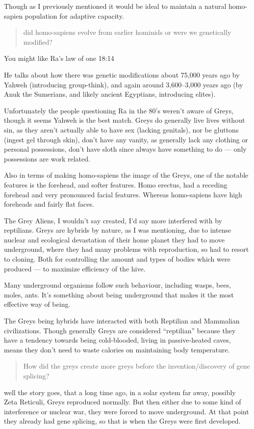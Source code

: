 Though as I previously mentioned it would be ideal to maintain a natural
homo-sapien population for adaptive capacity.


\blockquote{did homo-sapiens evolve from earlier hominids or were we genetically
modified?}

You might like Ra's law of one 18:14

He talks about how there was genetic modifications about 75,000 years ago by
Yahweh (introducing group-think), and again around 3,600--3,000 years ago (by
Anuk the Sumerians, and likely ancient Egyptians, introducing elites).

Unfortunately the people questioning Ra in the 80's weren't aware of Greys,
though it seems Yahweh is the best match. Greys do generally live lives without
sin, as they aren't actually able to have sex (lacking genitals), nor be
gluttons (ingest gel through skin), don't have any vanity, as generally lack any
clothing or personal possessions, don't have sloth since always have something to
do --- only possessions are work related.

Also in terms of making homo-sapiens the image of the Greys, one of the notable
features is the forehead, and softer features. Homo erectus, had a receding
forehead and very pronounced facial features. Whereas homo-sapiens have high
foreheads and fairly flat faces.

The Grey Aliens, I wouldn't say created, I'd say more interfered with by
reptilians. Greys are hybrids by nature, as I was mentioning, due to intense
nuclear and ecological devastation of their home planet they had to move
underground, where they had many problems with reproduction, so had to resort to
cloning. Both for controlling the amount and types of bodies which were produced
--- to maximize efficiency of the hive.

Many underground organisms follow such behaviour, including wasps, bees, moles,
ants. It's something about being underground that makes it the most effective
way of being.

The Greys being hybrids have interacted with both Reptilian and Mammalian
civilizations. Though generally Greys are considered ``reptilian'' because they
have a tendency towards being cold-blooded, living in passive-heated caves,
means they don't need to waste calories on maintaining body temperature.

\blockquote{How did the greys create more greys before the invention/discovery of gene
splicing?}

well the story goes, that a long time ago, in a solar system far away, possibly
Zeta Reticuli, Greys reproduced normally. But then either due to some kind of
interference or nuclear war, they were forced to move underground. At that point
they already had gene splicing, so that is when the Greys were first developed.

